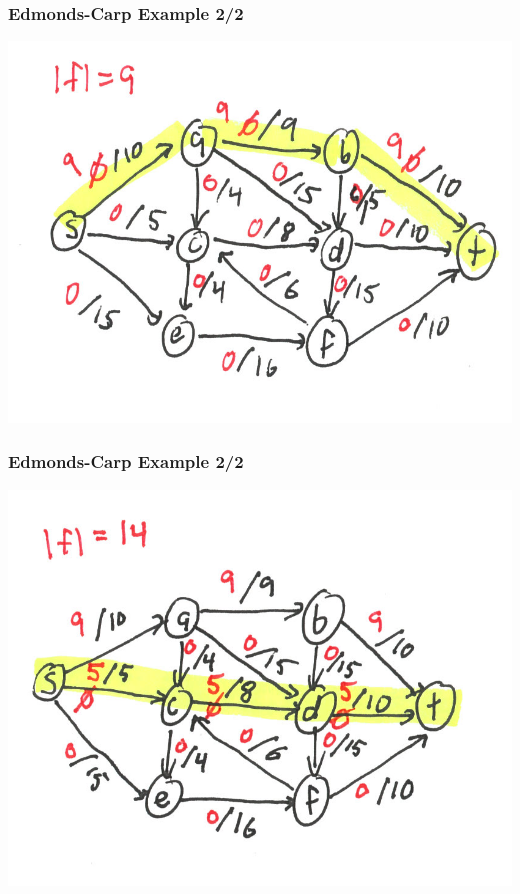 \documentclass{beamer}
\begin{document}
\begin{frame} \frametitle{Edmonds-Carp Example 2/2}
\begin{center}
  \includegraphics[scale=1]{ek-2-2.png}
\end{center}
\end{frame}

\begin{frame} \frametitle{Edmonds-Carp Example 2/2}
\begin{center}
  \includegraphics[scale=1]{ek-2-3.png}
\end{center}
\end{frame}
\end{document}

